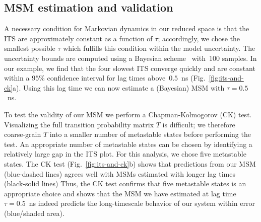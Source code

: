 \documentclass[9pt,tutorial]{livecoms}
\begin{document}
\subsection{MSM estimation and validation}
A necessary condition for Markovian dynamics in our reduced space is that the ITS are approximately constant as a function of $\tau$; accordingly, we chose the smallest possible $\tau$ which fulfills this condition within the model uncertainty. The uncertainty bounds are computed using a Bayesian scheme~\cite{ben-rev-msm,noe-tmat-sampling} with~$100$ samples.
In our example, we find that the four slowest ITS converge quickly and are constant within a $95\%$ confidence interval for lag times above~$0.5$~ns (Fig.~\ref{fig:its-and-ck}a). Using this lag time we can now estimate a (Bayesian) MSM with $\tau=0.5$~ns. 

To test the validity of our MSM we perform a Chapman-Kolmogorov (CK) test.
Visualizing the full transition probability matrix $T$ is difficult; we therefore coarse-grain $T$ into a smaller number of metastable states before performing the test.
An appropriate number of metastable states can be chosen by identifying a relatively large gap in the ITS plot.
For this analysis, we chose five metastable states.
The CK test (Fig.~\ref{fig:its-and-ck}b) shows that predictions from our MSM (blue-dashed lines) agrees well with MSMs estimated with longer lag times (black-solid lines)
Thus, the CK test confirms that five metastable states is an appropriate choice and shows that the MSM we have estimated at lag time $\tau=0.5$~ns indeed predicts the long-timescale behavior of our system within error (blue/shaded area).
\end{document}
